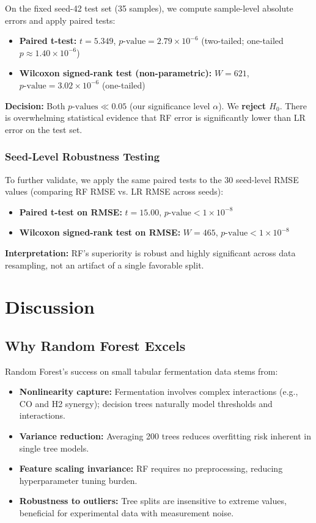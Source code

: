 \documentclass[conference]{IEEEtran}
\begin{document}
On the fixed seed-42 test set (35 samples), we compute sample-level absolute errors and apply paired tests:

\begin{itemize}
\item \textbf{Paired t-test:} $t = 5.349$, $p\text{-value} = 2.79 \times 10^{-6}$ (two-tailed; one-tailed $p \approx 1.40 \times 10^{-6}$)
\item \textbf{Wilcoxon signed-rank test (non-parametric):} $W = 621$, $p\text{-value} = 3.02 \times 10^{-6}$ (one-tailed)
\end{itemize}

\textbf{Decision:} Both $p\text{-values} \ll 0.05$ (our significance level $\alpha$). We \textbf{reject $H_0$}. There is overwhelming statistical evidence that RF error is significantly lower than LR error on the test set.

\subsubsection{Seed-Level Robustness Testing}

To further validate, we apply the same paired tests to the 30 seed-level RMSE values (comparing RF RMSE vs. LR RMSE across seeds):

\begin{itemize}
\item \textbf{Paired t-test on RMSE:} $t = 15.00$, $p\text{-value} < 1 \times 10^{-8}$
\item \textbf{Wilcoxon signed-rank test on RMSE:} $W = 465$, $p\text{-value} < 1 \times 10^{-8}$
\end{itemize}

\textbf{Interpretation:} RF's superiority is robust and highly significant across data resampling, not an artifact of a single favorable split.

\section{Discussion}

\subsection{Why Random Forest Excels}
Random Forest's success on small tabular fermentation data stems from:
\begin{itemize}
\item \textbf{Nonlinearity capture:} Fermentation involves complex interactions (e.g., CO and H2 synergy); decision trees naturally model thresholds and interactions.
\item \textbf{Variance reduction:} Averaging 200 trees reduces overfitting risk inherent in single tree models.
\item \textbf{Feature scaling invariance:} RF requires no preprocessing, reducing hyperparameter tuning burden.
\item \textbf{Robustness to outliers:} Tree splits are insensitive to extreme values, beneficial for experimental data with measurement noise.
\end{itemize}
\end{document}
